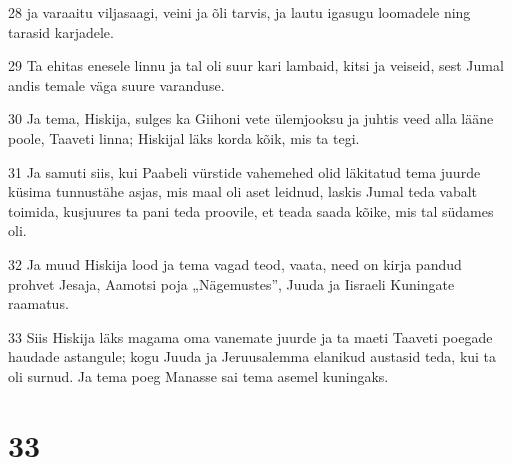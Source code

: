 \par 28 ja varaaitu viljasaagi, veini ja õli tarvis, ja lautu igasugu loomadele ning tarasid karjadele.
\par 29 Ta ehitas enesele linnu ja tal oli suur kari lambaid, kitsi ja veiseid, sest Jumal andis temale väga suure varanduse.
\par 30 Ja tema, Hiskija, sulges ka Giihoni vete ülemjooksu ja juhtis veed alla lääne poole, Taaveti linna; Hiskijal läks korda kõik, mis ta tegi.
\par 31 Ja samuti siis, kui Paabeli vürstide vahemehed olid läkitatud tema juurde küsima tunnustähe asjas, mis maal oli aset leidnud, laskis Jumal teda vabalt toimida, kusjuures ta pani teda proovile, et teada saada kõike, mis tal südames oli.
\par 32 Ja muud Hiskija lood ja tema vagad teod, vaata, need on kirja pandud prohvet Jesaja, Aamotsi poja „Nägemustes”, Juuda ja Iisraeli Kuningate raamatus.
\par 33 Siis Hiskija läks magama oma vanemate juurde ja ta maeti Taaveti poegade haudade astangule; kogu Juuda ja Jeruusalemma elanikud austasid teda, kui ta oli surnud. Ja tema poeg Manasse sai tema asemel kuningaks.

\chapter{33}

